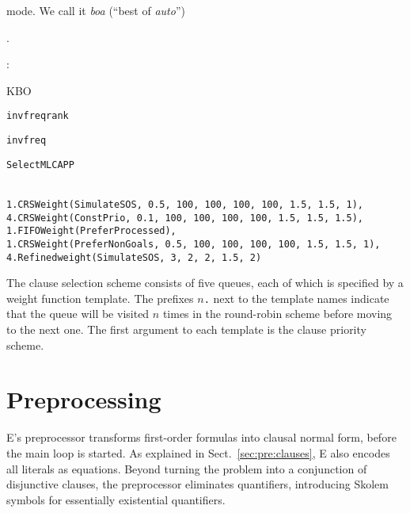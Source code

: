mode. We call it \emph{boa} (``best of \emph{auto}'')\begin{conf}.\end{conf}\begin{rep}:
%
\begin{description}[labelwidth=\widthof{Precedence generation:}]
  \item[\rm Term order:] KBO
  \item[\rm Weight generation:] \texttt{invfreqrank}
  \item[\rm Precedence generation:] \texttt{invfreq}
  \item[\rm Literal selection:] \texttt{SelectMLCAPP}
  \item[\rm Clause selection:] ~ \\
\verb|1.CRSWeight(SimulateSOS, 0.5, 100, 100, 100, 100, 1.5, 1.5, 1),| \\
\verb|4.CRSWeight(ConstPrio, 0.1, 100, 100, 100, 100, 1.5, 1.5, 1.5),| \\
\verb|1.FIFOWeight(PreferProcessed),| \\
\verb|1.CRSWeight(PreferNonGoals, 0.5, 100, 100, 100, 100, 1.5, 1.5, 1),| \\
\verb|4.Refinedweight(SimulateSOS, 3, 2, 2, 1.5, 2)|
\end{description}
%
The clause selection scheme consists of five queues, each of which is
specified by a weight function template. The prefixes $n$\texttt{.} next to
the template names indicate that the queue will be visited $n$ times in the round-robin scheme
before moving to the next one. The first argument to each
template is the clause priority scheme.




  

\section{Preprocessing}
\label{sec:ehoh:preprocessing}

E's preprocessor transforms first-order formulas into clausal
normal form, before the main loop is started. %
As explained in Sect.~\ref{sec:pre:clauses}, E also encodes all literals
as equations.
Beyond turning the problem into a
conjunction of disjunctive clauses, the preprocessor eliminates quantifiers,
introducing Skolem symbols for essentially existential quantifiers.


\end{rep}
